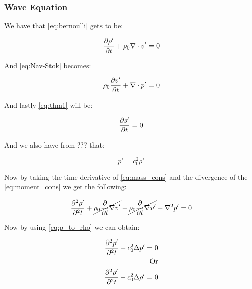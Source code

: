 \documentclass[main.tex]{subfiles}
\begin{document}
\subsubsection{Wave Equation}


We have that \autoref{eq:bernoulli} gets to be:

\begin{equation}
    \frac{\partial \rho'}{\partial t} + \rho_0\nabla \cdot v' = 0
    \label{eq:mass_cons}
\end{equation}

And \autoref{eq:Nav-Stok} becomes:

\begin{equation}
    \rho_0 \frac{\partial v'}{\partial t} + \nabla \cdot p' = 0
    \label{eq:moment_cons}
\end{equation}

And lastly \autoref{eq:thm1} will be:

\begin{equation}
    \frac{\partial s'}{\partial t} = 0
    \label{eq:energy_cons}
\end{equation}

And we also have from ??? that:

\begin{equation}
    p' = c_0^2\rho'
    \label{eq:p_to_rho}
\end{equation}

Now by taking the time derivative of \autoref{eq:mass_cons} and the divergence of the \autoref{eq:moment_cons} we get the following:

$$\frac{\partial^{2} \rho'}{\partial^{2} t} + \cancel{\rho_0 \frac{\partial }{\partial t} \nabla v'} - \cancel{\rho_0 \frac{\partial }{\partial t} \nabla v'} - \nabla^2 p' = 0$$

Now by using \autoref{eq:p_to_rho} we can obtain:

\begin{align}
    \frac{\partial^{2} p'}{\partial^{2} t} - c_0^2\Delta p' = 0 \label{eq:wave_p} \\
    \text{Or} \\
    \frac{\partial^{2} \rho'}{\partial^{2} t} - c_0^2\Delta \rho' = 0 \label{eq:wave_\rho}
\end{align}
\end{document}
